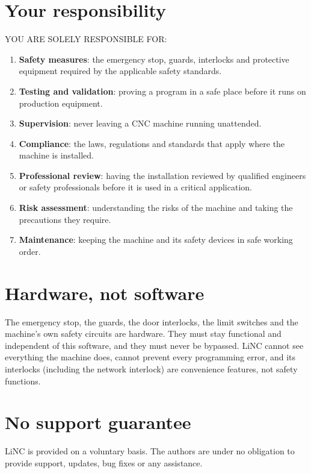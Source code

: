 \section*{Your responsibility}

YOU ARE SOLELY RESPONSIBLE FOR:

\begin{enumerate}
  \item \textbf{Safety measures}: the emergency stop, guards, interlocks and protective
        equipment required by the applicable safety standards.
  \item \textbf{Testing and validation}: proving a program in a safe place before it runs
        on production equipment.
  \item \textbf{Supervision}: never leaving a CNC machine running unattended.
  \item \textbf{Compliance}: the laws, regulations and standards that apply where the
        machine is installed.
  \item \textbf{Professional review}: having the installation reviewed by qualified
        engineers or safety professionals before it is used in a critical application.
  \item \textbf{Risk assessment}: understanding the risks of the machine and taking the
        precautions they require.
  \item \textbf{Maintenance}: keeping the machine and its safety devices in safe working
        order.
\end{enumerate}

\section*{Hardware, not software}

The emergency stop, the guards, the door interlocks, the limit switches and the machine's
own safety circuits are hardware. They must stay functional and independent of this
software, and they must never be bypassed. LiNC cannot see everything the machine does,
cannot prevent every programming error, and its interlocks (including the network
interlock) are convenience features, not safety functions.

\section*{No support guarantee}

LiNC is provided on a voluntary basis. The authors are under no obligation to provide
support, updates, bug fixes or any assistance.

